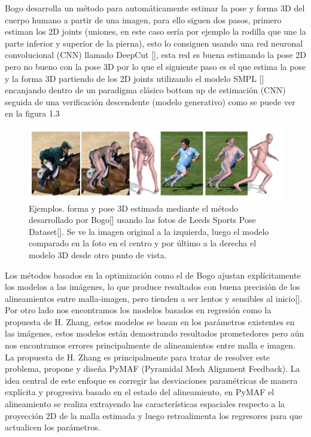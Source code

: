 Bogo desarrolla un método para automáticamente estimar la pose y forma 3D del cuerpo humano a partir de una imagen, para ello siguen dos pasos, primero estiman los 2D joints (uniones, en este caso sería por ejemplo la rodilla que une la parte inferior y superior de la pierna), esto lo consiguen usando una red neuronal convolucional (CNN) llamado DeepCut [\cite{deepcut}], esta red es buena estimando la pose 2D pero no bueno con la pose 3D por lo que el siguiente paso es el que estima la pose y la forma 3D partiendo de los 2D joints utilizando el modelo SMPL [\cite{smpl}] encanjando dentro de un paradigma clásico bottom up de estimación (CNN) seguida de una verificación descendente (modelo generativo) como se puede ver en la figura 1.3
\begin{figure}[H]
	\centering
	\includegraphics[scale=0.7]{imagenes/estadoarte2.png}
	\caption{Ejemplos. forma y pose 3D estimada mediante el método desarrollado por Bogo[\cite{keepsmpl}] usando las fotos de Leeds Sports Pose Dataset[\cite{edafig2}]. Se ve la imagen original a la izquierda, luego el modelo comparado en la foto en el centro y por último a la derecha el modelo 3D desde otro punto de vista. }
	\label{fig:figura3}
\end{figure}
Los métodos basados en la optimización como el de Bogo ajustan explícitamente los modelos a las imágenes, lo que produce resultados con buena precisión de los alineamientos entre malla-imagen, pero tienden a ser lentos y sensibles al inicio[\cite{pymaf}]. 
\\
Por otro lado nos encontramos los modelos basados en regresión como la propuesta de H. Zhang, estos modelos se basan en los parámetros existentes en las imágenes, estos modelos están demostrando resultados prometedores pero aún nos encontramos errores principalmente de alineamientos entre malla e imagen. La propuesta de H. Zhang es principalmente para tratar de resolver este problema, propone y diseña PyMAF (Pyramidal Mesh Alignment Feedback). La idea central de este enfoque es corregir las desviaciones paramétricas de manera explícita y progresiva basado en el estado del alineamiento, en PyMAF el alineamiento se realiza extrayendo las características espaciales respecto a la proyección 2D de la malla estimada y luego retroalimenta los regresores para que actualicen los parámetros.
